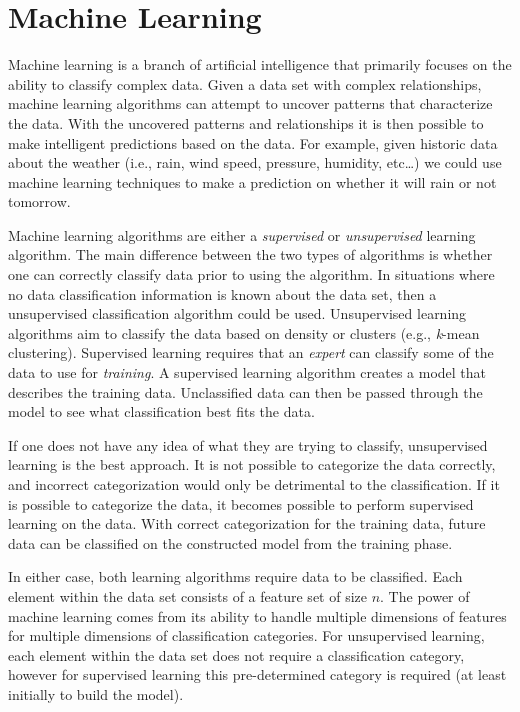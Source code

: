 \section{Machine Learning}
\label{sec:background_machine_learning}
Machine learning is a branch of artificial intelligence that primarily focuses on the ability to classify complex data. Given a data set with complex relationships, machine learning algorithms can attempt to uncover patterns that characterize the data. With the uncovered patterns and relationships it is then possible to make intelligent predictions based on the data. For example, given historic data about the weather (i.e., rain, wind speed, pressure, humidity, etc\ldots) we could use machine learning techniques to make a prediction on whether it will rain or not tomorrow.

Machine learning algorithms are either a \emph{supervised} or \emph{unsupervised} learning algorithm. The main difference between the two types of algorithms is whether one can correctly classify data prior to using the algorithm. In situations where no data classification information is known about the data set, then a unsupervised classification algorithm could be used. Unsupervised learning algorithms aim to classify the data based on density or clusters (e.g., \emph{k}-mean clustering). Supervised learning requires that an \emph{expert} can classify some of the data to use for \emph{training}. A supervised learning algorithm creates a model that describes the training data. Unclassified data can then be passed through the model to see what classification best fits the data.

If one does not have any idea of what they are trying to classify, unsupervised learning is the best approach. It is not possible to categorize the data correctly, and incorrect categorization would only be detrimental to the classification. If it is possible to categorize the data, it becomes possible to perform supervised learning on the data. With correct categorization for the training data, future data can be classified on the constructed model from the training phase.

In either case, both learning algorithms require data to be classified. Each element within the data set consists of a feature set of size $n$. The power of machine learning comes from its ability to handle multiple dimensions of features for multiple dimensions of classification categories. For unsupervised learning, each element within the data set does not require a classification category, however for supervised learning this pre-determined category is required (at least initially to build the model).

